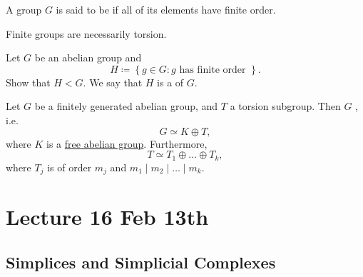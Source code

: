 \documentclass[notoc,notitlepage]{tufte-book}
\begin{document}
\begin{defn}\label{defn:torsion_group}
  A group $G$ is said to be  if all of its elements have finite
  order.
\end{defn}

\begin{eg}
  Finite groups are necessarily torsion.
\end{eg}

\begin{ex}
  Let $G$ be an abelian group and
  \begin{equation*}
    H \coloneqq \left\{ g \in G : g \text{ has finite order } \right\}.
  \end{equation*}
  Show that $H < G$. We say that $H$ is a  of $G$.
\end{ex}

\begin{thm}\label{thm:fundamental_theorem_of_finitely_generated_abelian_groups}
  Let $G$ be a finitely generated abelian group, and $T$ a torsion subgroup.
  Then $G$ , i.e.
  \begin{equation*}
    G \simeq K \oplus T,
  \end{equation*}
  where $K$ is a \hyperref[defn:free_abelian_groups]{free abelian group}.
  Furthermore,
  \begin{equation*}
    T \simeq T_1 \oplus \hdots \oplus T_k,
  \end{equation*}
  where $T_j$ is of order $m_j$ and $m_1 \mid m_2 \mid \hdots \mid m_k$.
\end{thm}




\chapter{Lecture 16 Feb 13th}%
\label{chp:lecture_16_feb_13th}

\section{Simplices and Simplicial Complexes}%
\label{sec:simplices_and_simplicial_complexes}
\end{document}
